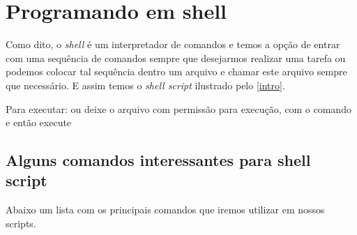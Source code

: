 \documentclass[11pt]{ifscarticle}
\begin{document}
\section{Programando em shell}

Como dito, o \textit{shell} é um interpretador de comandos e temos a opção de entrar com uma sequência de comandos sempre que desejarmos realizar uma tarefa ou podemos colocar tal sequência dentro um arquivo e chamar este arquivo sempre que necessário. E assim temos o \textit{shell script} ilustrado pelo \autoref{intro}.



\begin{tip}
    Para executar:  ou deixe o arquivo com permissão para execução, com o comando  e então execute 
\end{tip}

\subsection{Alguns comandos interessantes para shell script}

Abaixo um lista com os principais comandos que iremos utilizar em nossos scripts.
\end{document}
